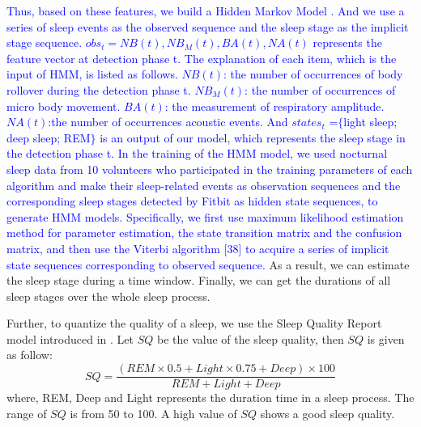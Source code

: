 \textcolor{blue}{Thus, based on these features, we build a Hidden Markov Model \cite{johnson2010hidden}. And we use a series of sleep events as the observed sequence and the sleep stage as the implicit stage sequence. $obs_t={NB(t),NB_M(t),BA(t),NA(t)}$ represents the feature vector at detection phase t. The explanation of each item, which is the input of HMM, is listed as follows. $NB(t)$: the number of occurrences of body rollover during the detection phase t. $NB_M(t)$: the number of occurrences of micro body movement. $BA(t)$: the measurement of  respiratory amplitude. $NA(t)$:the number of occurrences acoustic events. And $states_t$ =$\{$light sleep; deep sleep; REM$\}$ is an output of our model, which represents the sleep stage in the detection phase t. In the training of the HMM model, we used nocturnal sleep data from 10 volunteers who participated in the training parameters of each algorithm and make their sleep-related events as observation sequences and the corresponding sleep stages detected by Fitbit as hidden state sequences, to generate HMM models. Specifically, we first use maximum likelihood estimation method for parameter estimation, the state transition matrix and the confusion matrix, and then use the Viterbi algorithm [38] to acquire a series of implicit state sequences corresponding to observed sequence.} As a result, we can estimate the sleep stage during a time window. Finally, we can get the durations of all sleep stages over the whole sleep process.

Further, to quantize the quality of a sleep, we use the Sleep Quality Report model introduced in \cite{gu2016sleep}. Let $SQ$ be the value of the sleep quality, then $SQ$ is given as follow:
 \begin{equation}
SQ=\frac{(REM \times 0.5+Light \times 0.75+Deep) \times 100}{REM+Light+Deep}
 \end{equation}
where, REM, Deep and Light represents the duration time in a sleep process. The range of $SQ$ is from 50 to 100. A high value of $SQ$ shows a good  sleep quality.
